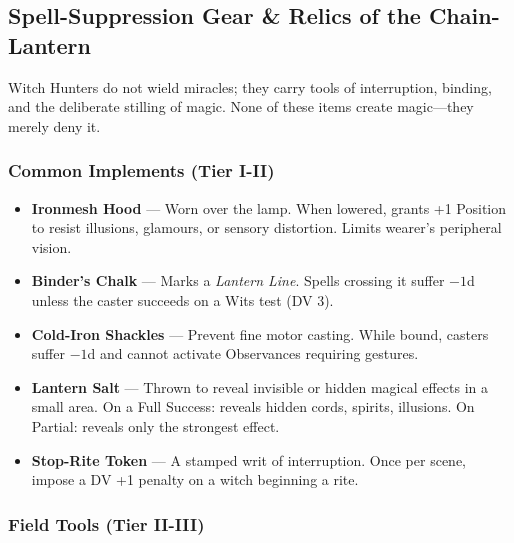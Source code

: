 \documentclass[11pt]{book}
\begin{document}
\subsection{Spell-Suppression Gear \& Relics of the Chain-Lantern}

Witch Hunters do not wield miracles; they carry tools of interruption, binding, 
and the deliberate stilling of magic.  
None of these items create magic---they merely deny it.

\subsubsection*{Common Implements (Tier I-II)}

\begin{itemize}[leftmargin=*]
    \item \textbf{Ironmesh Hood} --- Worn over the lamp. When lowered, grants +1 Position 
    to resist illusions, glamours, or sensory distortion. 
    Limits wearer's peripheral vision.

    \item \textbf{Binder's Chalk} --- Marks a \emph{Lantern Line}.  
    Spells crossing it suffer \(-1\)d unless the caster succeeds on a Wits test (DV 3).

    \item \textbf{Cold-Iron Shackles} --- Prevent fine motor casting.  
    While bound, casters suffer \(-1\)d and cannot activate Observances requiring gestures.

    \item \textbf{Lantern Salt} --- Thrown to reveal invisible or hidden magical effects 
    in a small area.  
    On a Full Success: reveals hidden cords, spirits, illusions.  
    On Partial: reveals only the strongest effect.

    \item \textbf{Stop-Rite Token} --- A stamped writ of interruption.  
    Once per scene, impose a DV +1 penalty on a witch beginning a rite.
\end{itemize}

\subsubsection*{Field Tools (Tier II-III)}
\end{document}
